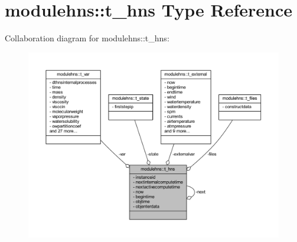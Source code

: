 \hypertarget{structmodulehns_1_1t__hns}{}\section{modulehns\+:\+:t\+\_\+hns Type Reference}
\label{structmodulehns_1_1t__hns}


Collaboration diagram for modulehns\+:\+:t\+\_\+hns\+:\nopagebreak
\begin{figure}[H]
\begin{center}
\leavevmode
\includegraphics[width=350pt]{structmodulehns_1_1t__hns__coll__graph}
\end{center}
\end{figure}
